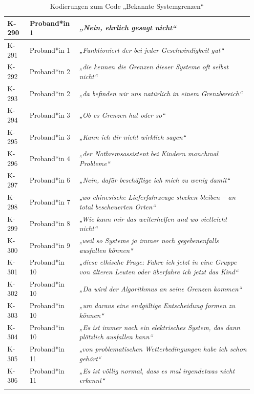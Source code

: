 {\begin{xltabular}{\textwidth}{
    |P{0.10\textwidth}
    |P{0.17\textwidth}
    |Y|
}
K-290 & Proband*in 1 & \textit{„Nein, ehrlich gesagt nicht“} \\
\hline
K-291 & Proband*in 1 & \textit{„Funktioniert der bei jeder Geschwindigkeit gut“} \\
\hline
K-292 & Proband*in 2 & \textit{„die kennen die Grenzen dieser Systeme oft selbst nicht“} \\
\hline
K-293 & Proband*in 2 & \textit{„da befinden wir uns natürlich in einem Grenzbereich“} \\
\hline
K-294 & Proband*in 3 & \textit{„Ob es Grenzen hat oder so“} \\
\hline
K-295 & Proband*in 3 & \textit{„Kann ich dir nicht wirklich sagen“} \\
\hline
K-296 & Proband*in 4 & \textit{„der Notbremsassistent bei Kindern manchmal Probleme“} \\
\hline
K-297 & Proband*in 6 & \textit{„Nein, dafür beschäftige ich mich zu wenig damit“} \\
\hline
K-298 & Proband*in 7 & \textit{„wo chinesische Lieferfahrzeuge stecken bleiben – an total bescheuerten Orten“} \\
\hline
K-299 & Proband*in 8 & \textit{„Wie kann mir das weiterhelfen und wo vielleicht nicht“} \\
\hline
K-300 & Proband*in 9 & \textit{„weil so Systeme ja immer noch gegebenenfalls ausfallen können“} \\
\hline
K-301 & Proband*in 10 & \textit{„diese ethische Frage: Fahre ich jetzt in eine Gruppe von älteren Leuten oder überfahre ich jetzt das Kind“} \\
\hline
K-302 & Proband*in 10 & \textit{„Da wird der Algorithmus an seine Grenzen kommen“} \\
\hline
K-303 & Proband*in 10 & \textit{„um daraus eine endgültige Entscheidung formen zu können“} \\
\hline
K-304 & Proband*in 10 & \textit{„Es ist immer noch ein elektrisches System, das dann plötzlich ausfallen kann“} \\
\hline
K-305 & Proband*in 11 & \textit{„von problematischen Wetterbedingungen habe ich schon gehört“} \\
\hline
K-306 & Proband*in 11 & \textit{„Es ist völlig normal, dass es mal irgendetwas nicht erkennt“} \\
\hline
\caption{Kodierungen zum Code „Bekannte Systemgrenzen“}\label{tab:kodiernachweis-bekannte-systemgrenzen}\\
\end{xltabular}
}

